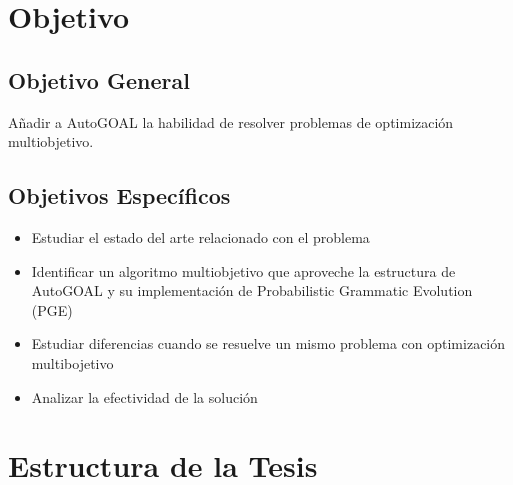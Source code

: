 

\section*{Objetivo}
\subsection*{Objetivo General}
Añadir a AutoGOAL la habilidad de resolver problemas de optimizaci\'on multiobjetivo.
\subsection*{Objetivos Espec\'ificos}
\begin{itemize}
    \item Estudiar el estado del arte relacionado con el problema
    \item Identificar un algoritmo multiobjetivo que aproveche la estructura de AutoGOAL y su implementaci\'on de Probabilistic Grammatic Evolution (PGE)
    \item Estudiar diferencias cuando se resuelve un mismo problema con optimizaci\'on multibojetivo
    \item Analizar la efectividad de la soluci\'on
\end{itemize}

\section*{Estructura de la Tesis}
